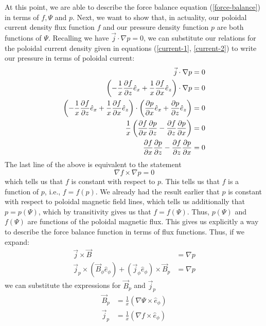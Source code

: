 At this point, we are able to describe the force balance equation (\ref{force-balance}) in terms of $f, \Psi$ and $p$. Next, 
we want to show that, in actuality, our poloidal current density flux function $f$ and our pressure density 
function $p$ are both functions of $\Psi$. Recalling we have $\vec{j} \cdot \nabla p = 0$, we can 
substitute our relations for the poloidal current density given in equations (\ref{current-1}, \ref{current-2}) to 
write our pressure in terms of poloidal current:
\begin{align*}
    \vec{j} \cdot \nabla p &= 0 \\
    \left ( -\frac{1}{x} \pdv{f}{z} \hat{e}_{x} + \frac{1}{x} \pdv{f}{x} \hat{e}_{z} \right ) \cdot \nabla p &= 0 \\
    \left ( -\frac{1}{x} \pdv{f}{z} \hat{e}_{x} + \frac{1}{x} \pdv{f}{x} \hat{e}_{z} \right ) \cdot \left ( \pdv{p}{x} \hat{e}_{x} +  \pdv{p}{z} \hat{e}_{z} \right ) &= 0 \\
    \frac{1}{x} \left ( \pdv{f}{x} \pdv{p}{z} - \pdv{f}{z} \pdv{p}{x} \right ) &= 0 \\
    \pdv{f}{x} \pdv{p}{z} - \pdv{f}{z} \pdv{p}{x} &= 0
\end{align*}
The last line of the above is equivalent to the statement
\begin{equation*}
    \nabla f \times \nabla p = 0
\end{equation*}
which tells us that $f$ is constant with respect to $p$. This tells us that $f$ is a function of $p$, 
i.e., $f = f(p)$. We already had the result earlier that $p$ is constant with respect to poloidal magnetic field lines, 
which tells us additionally that $p = p(\Psi)$, which by transitivity gives us that $f = f(\Psi)$. Thus, $p(\Psi)$ and $f(\Psi)$
are functions of the poloidal magnetic flux. This gives us explicitly a way to describe the force balance 
function in terms of flux functions. Thus, if we expand:
\begin{align*}
    \vec{j} \times \vec{B} &= \nabla p \\
    \vec{j}_p \times (\vec{B}_\phi \hat{e}_{\phi}) + (\vec{j}_{\phi} \hat{e}_{\phi}) \times \vec{B}_p &= \nabla p
\end{align*}
we can substitute the expressions for $\vec{B}_p$ and $\vec{j}_p$
\begin{align*}
    \vec{B}_p &= \frac{1}{x} \left ( \nabla \Psi \times \hat{e}_{\phi} \right ) \\
    \vec{j}_p &= \frac{1}{x} \left ( \nabla f \times \hat{e}_{\phi} \right )
\end{align*}
